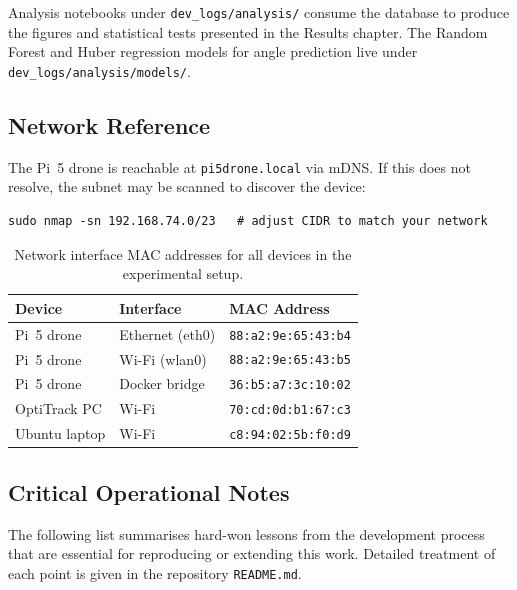 Analysis notebooks under \texttt{dev\_logs/analysis/} consume the database to produce the figures and statistical tests presented in the Results chapter. The Random Forest and Huber regression models for angle prediction live under \texttt{dev\_logs/analysis/models/}.

\subsection{Network Reference}

The Pi~5 drone is reachable at \texttt{pi5drone.local} via mDNS. If this does not resolve, the subnet may be scanned to discover the device:

\begin{lstlisting}[basicstyle=\ttfamily\footnotesize,numbers=none]
sudo nmap -sn 192.168.74.0/23   # adjust CIDR to match your network
\end{lstlisting}

\begin{table}[htbp]
\centering
\caption{Network interface MAC addresses for all devices in the experimental setup.}
\label{tab:mac_addresses}
\begin{tabular}{lll}
\toprule
\textbf{Device} & \textbf{Interface} & \textbf{MAC Address} \\
\midrule
Pi~5 drone & Ethernet (eth0) & \texttt{88:a2:9e:65:43:b4} \\
Pi~5 drone & Wi-Fi (wlan0)  & \texttt{88:a2:9e:65:43:b5} \\
Pi~5 drone & Docker bridge   & \texttt{36:b5:a7:3c:10:02} \\
OptiTrack PC & Wi-Fi          & \texttt{70:cd:0d:b1:67:c3} \\
Ubuntu laptop & Wi-Fi         & \texttt{c8:94:02:5b:f0:d9} \\
\bottomrule
\end{tabular}
\end{table}

\subsection{Critical Operational Notes}

The following list summarises hard-won lessons from the development process that are essential for reproducing or extending this work. Detailed treatment of each point is given in the repository \texttt{README.md}.

